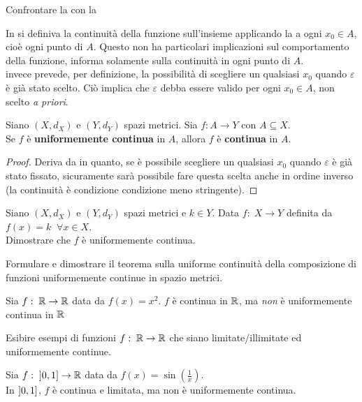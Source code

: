 \begin{exercise}
	\label{ex:cont_unif_cont_comparision}
	Confrontare la  con la 
	\begin{solution}
		In  si definiva la continuità della funzione sull'insieme applicando la  a ogni $x_0 \in A$, cioè ogni punto di $A$. Questo non ha particolari implicazioni sul comportamento della funzione, informa solamente sulla continuità in ogni punto di $A$.\\
		 invece prevede, per definizione, la possibilità di scegliere un qualsiasi $x_0$ quando $\varepsilon$ è già stato scelto. Ciò implica che $\varepsilon$ debba essere valido per ogni $x_0 \in A$, non scelto \textit{a priori}.
	\end{solution}
\end{exercise}
\begin{proposition}
	\label{prop:if_unif_cont_then_conf}
	Siano $(X,d_X)$ e $(Y,d_Y)$ spazi metrici. Sia $f:A \to Y$ con $A \subseteq X$.\\
	Se $f$ è \textbf{uniformemente continua} in $A$, allora $f$ è \textbf{continua} in $A$.
	\begin{proof}
		Deriva da  in quanto, se è possibile scegliere un qualsiasi $x_0$ quando $\varepsilon$ è già stato fissato, sicuramente sarà possibile fare questa scelta anche in ordine inverso (la continuità è condizione condizione meno stringente).
	\end{proof}
\end{proposition}
\begin{exercise}
	Siano $(X,d_X)$ e $(Y,d_Y)$ spazi metrici e $k \in Y$. Data $f:\; X \to Y$ definita da $f(x) = k\;\; \forall x \in X$.\\
	Dimostrare che $f$ è uniformemente continua.
\end{exercise}
\begin{exercise}
	Formulare e dimostrare il teorema sulla uniforme continuità della composizione di funzioni uniformemente continue in spazio metrici.
\end{exercise}
\begin{example}
	Sia $f:\; \mathbb{R} \to \mathbb{R}$ data da $f(x) = x^2$. $f$ è continua in $\mathbb{R}$, ma \textit{non} è uniformemente continua in $\mathbb{R}$
\end{example}
\begin{exercise}
	Esibire esempi di funzioni $f:\; \mathbb{R} \to \mathbb{R}$ che siano limitate/illimitate ed uniformemente continue.
\end{exercise}
\begin{example}
	Sia $f:\; \left]0,1\right] \to \mathbb{R}$ data da $f(x) = \sin(\frac{1}{x})$.\\
	In $\left]0,1\right]$, $f$ è continua e limitata, ma non è uniformemente continua.
\end{example}

